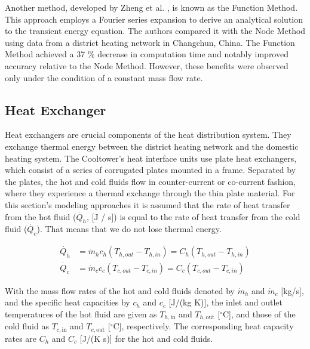 Another method, developed by Zheng et al. \cite{ZHENG2017682}, is known as the Function Method. This approach employs a Fourier series expansion to derive an analytical solution to the transient energy equation. The authors compared it with the Node Method using data from a district heating network in Changchun, China. The Function Method achieved a 37 \% decrease in computation time and notably improved accuracy relative to the Node Method. However, these benefits were observed only under the condition of a constant mass flow rate. 

\subsection{Heat Exchanger}
Heat exchangers are crucial components of the heat distribution system. They exchange thermal energy between the district heating network and the domestic heating system. The Cooltower's heat interface units use plate heat exchangers, which consist of a series of corrugated plates mounted in a frame. Separated by the plates, the hot and cold fluids flow in counter-current or co-current fashion, where they experience a thermal exchange through the thin plate material. 
For this section's modeling approaches it is assumed that the rate of heat transfer from the hot fluid ($\dot{Q_{h}}$, [J / s]) is equal to the rate of heat transfer from the cold fluid ($\dot{Q_{c}}$). That means that we do not lose thermal energy. 

\begin{align}
    \dot{Q_h} &= \dot{m}_hc_h(T_{h,out} - T_{h,in}) = C_h (T_{h,out} - T_{h,in}) \\  
    \dot{Q_c} &= \dot{m}_cc_c(T_{c,out} - T_{c,in}) = C_c (T_{c,out} - T_{c,in})
\end{align}

With the mass flow rates of the hot and cold fluids denoted by \( \dot{m}_h \) and \( \dot{m}_c \) [kg/s], and the specific heat capacities by \( c_h \) and \( c_c \) [J/(kg K)], the inlet and outlet temperatures of the hot fluid are given as \( T_{h,\text{in}} \) and \( T_{h,\text{out}} \) [\( ^\circ \)C], and those of the cold fluid as \( T_{c,\text{in}} \) and \( T_{c,\text{out}} \) [\( ^\circ \)C], respectively. The corresponding heat capacity rates are \( C_h \) and \( C_c \) [J/(K s)] for the hot and cold fluids.

